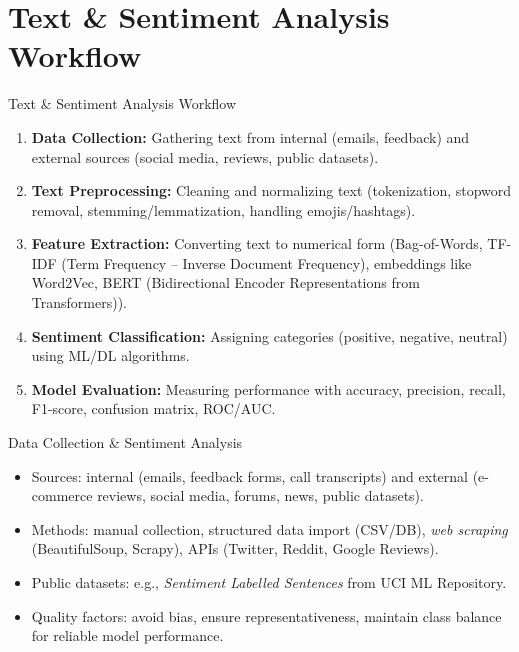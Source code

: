 \documentclass[aspectratio=169, table]{beamer}
\begin{document}
\section{Text \& Sentiment Analysis Workflow}

\begin{frame}{Text \& Sentiment Analysis Workflow}
	\vspace{20pt}
	\begin{enumerate}
		\item \textbf{Data Collection:} Gathering text from internal (emails, feedback) and external sources (social media, reviews, public datasets).
		\item \textbf{Text Preprocessing:} Cleaning and normalizing text (tokenization, stopword removal, stemming/lemmatization, handling emojis/hashtags).
		\item \textbf{Feature Extraction:} Converting text to numerical form (Bag-of-Words, TF-IDF (Term Frequency – Inverse Document Frequency), embeddings like Word2Vec, BERT (Bidirectional Encoder Representations from Transformers)).
		\item \textbf{Sentiment Classification:} Assigning categories (positive, negative, neutral) using ML/DL algorithms.
		\item \textbf{Model Evaluation:} Measuring performance with accuracy, precision, recall, F1-score, confusion matrix, ROC/AUC.
	\end{enumerate}
\end{frame}

\begin{frame}{Data Collection \& Sentiment Analysis}
	\vspace{20pt}
	\begin{itemize}
		\item Sources: internal (emails, feedback forms, call transcripts) and external (e-commerce reviews, social media, forums, news, public datasets).
		\item Methods: manual collection, structured data import (CSV/DB), \textit{web scraping} (BeautifulSoup, Scrapy), APIs (Twitter, Reddit, Google Reviews).
		\item Public datasets: e.g., \textit{Sentiment Labelled Sentences} from UCI ML Repository.
		\item Quality factors: avoid bias, ensure representativeness, maintain class balance for reliable model performance.
	\end{itemize}
\end{frame}
\end{document}
